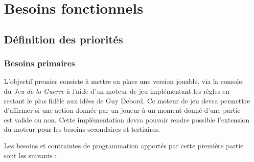 \documentclass[a4paper]{report}
\begin{document}
\chapter{Besoins fonctionnels}

\section{Définition des priorités}
\subsection{Besoins primaires} %

L'objectif premier consiste à mettre en place une version jouable, via la console, du \textit{Jeu de la Guerre} à l'aide d'un moteur de jeu implémentant les règles en restant le plus fidèle aux idées de Guy Debord. Ce moteur de jeu devra permettre d'affirmer si une action donnée par un joueur à un moment donné d'une partie est valide ou non. Cette implémentation devra pouvoir rendre possible l'extension du moteur pour les besoins secondaires et tertiaires.
\newline


Les besoins et contraintes de programmation apportés par cette première partie sont les suivants :
\end{document}
